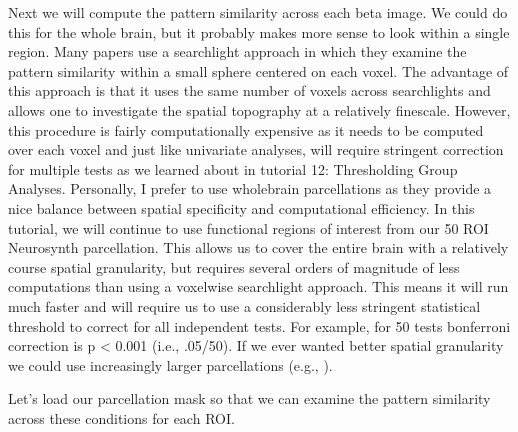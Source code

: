 \documentclass[letterpaper,10pt,english]{sphinxmanual}
\begin{document}
Next we will compute the pattern similarity across each beta image. We could do this for the whole brain, but it probably makes more sense to look within a single region. Many papers use a searchlight approach in which they examine the pattern similarity within a small sphere centered on each voxel. The advantage of this approach is that it uses the same number of voxels across searchlights and allows one to investigate the spatial topography at a relatively fine\sphinxhyphen{}scale. However, this procedure is fairly computationally expensive as it needs to be computed over each voxel and just like univariate analyses, will require stringent correction for multiple tests as we learned about in tutorial 12: Thresholding Group Analyses. Personally, I prefer to use whole\sphinxhyphen{}brain parcellations as they provide a nice balance between spatial specificity and computational efficiency. In this tutorial, we will continue to use functional regions of interest from our 50 ROI Neurosynth parcellation. This allows us to cover the entire brain with a relatively course spatial granularity, but requires several orders of magnitude of less computations than using a voxelwise searchlight approach. This means it will run much faster and will require us to use a considerably less stringent statistical threshold to correct for all independent tests. For example, for 50 tests bonferroni correction is p \textless{} 0.001 (i.e., .05/50). If we ever wanted better spatial granularity we could use increasingly larger parcellations (e.g., ).

Let’s load our parcellation mask so that we can examine the pattern similarity across these conditions for each ROI.

\begin{sphinxVerbatim}[commandchars=\\\{\}]
    
  

\end{sphinxVerbatim}
\end{document}
